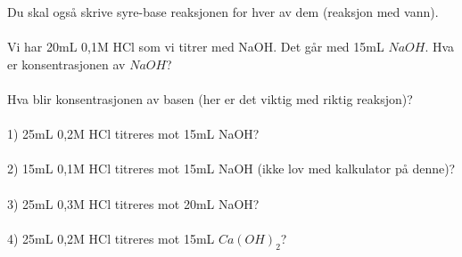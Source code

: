 \documentclass{minmal}
\begin{document}
Du skal også skrive syre-base reaksjonen for hver av dem (reaksjon med vann).\\\\
Vi har 20mL 0,1M HCl som vi titrer med NaOH. Det går med 15mL $NaOH$.  Hva er konsentrasjonen av $NaOH$? \\\\
\noindent
Hva blir konsentrasjonen av basen (her er det viktig med riktig reaksjon)?\\\\
1) 25mL 0,2M HCl titreres mot 15mL NaOH?\\\\
2) 15mL 0,1M HCl titreres mot 15mL NaOH  (ikke lov med kalkulator på denne)?\\\\
3) 25mL 0,3M HCl titreres mot 20mL NaOH?\\\\
4) 25mL 0,2M HCl titreres mot 15mL $Ca(OH)_2$? 
\end{document}
